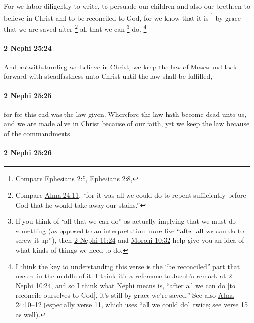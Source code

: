 			For we labor diligently to write,
			to persuade our children and also our brethren
			to believe in Christ and to be \hyperref[RECONCILIATION]{reconciled} to God,
			for we know that it is
				\footnote{%
					Compare \hyperref[EPHESIANS-2-5]{Ephesians 2:5}, \hyperref[EPHESIANS-2-8]{Ephesians 2:8}, 
					}%
			by grace that we are saved
			after
				\footnote{%
					Compare \hyperref[ALMA-24-11]{Alma 24:11}, ``for it was all we could do to repent sufficiently before God that he would take away our stains.''
					}%
			all that we can
				\footnote{%
					If you think of ``all that we can do'' as actually implying that we must do something (as opposed to an interpretation more like ``after all we can do to screw it up''), then \hyperref[2NEPHI-10-24]{2 Nephi 10:24} and \hyperref[MORONI-10-32]{Moroni 10:32} help give you an idea of what kinds of things we need to do.
					}%
			do.%
				\footnote{%
					I think the key to understanding this verse is the ``be reconciled'' part that occurs in the middle of it. I think it's a reference to Jacob's remark at \hyperref[2NEPHI-10-24]{2 Nephi 10:24}, and so I think what Nephi means is, ``after all we can do [to reconcile ourselves to God], it's still by grace we're saved.'' See also \hyperref[ALMA-24-10]{Alma 24:10--12} (especially verse 11, which uses ``all we could do'' twice; see verse 15 as well).
					}

		\paragraph{2 Nephi 25:24} %
			\label{2NEPHI-25-24}

			And notwithstanding we believe in Christ,
			we keep the law of Moses
			and look forward with steadfastness unto Christ
			until the law shall be fulfilled,

		\paragraph{2 Nephi 25:25} %
			\label{2NEPHI-25-25}

			for for this end was the law given.
			Wherefore the law hath become dead unto us,
			and we are made alive in Christ because of our faith,
			yet we keep the law because of the commandments.

		\paragraph{2 Nephi 25:26} %
			\label{2NEPHI-25-26}

